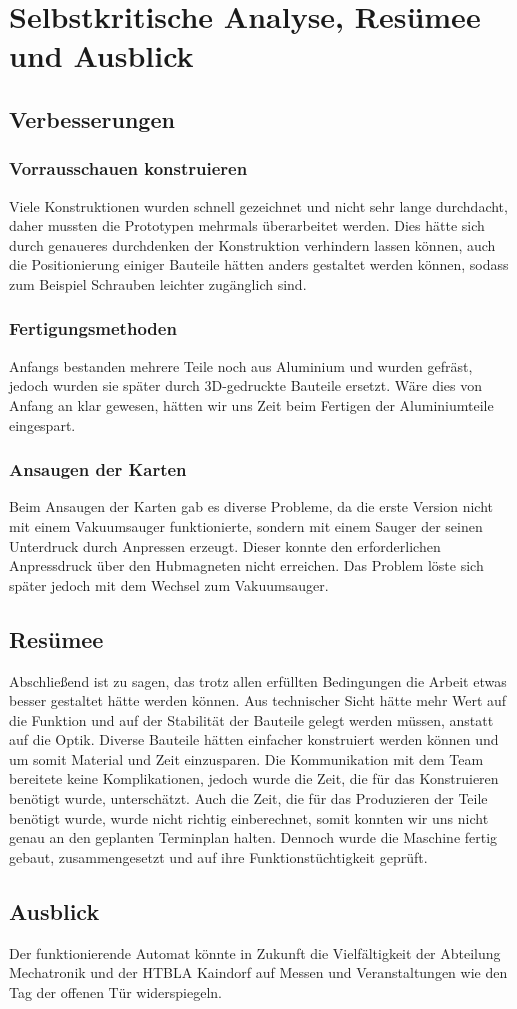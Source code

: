 \section{Selbstkritische Analyse, Resümee und Ausblick}
\subsection{Verbesserungen}

\subsubsection{Vorrausschauen konstruieren}
Viele Konstruktionen wurden schnell gezeichnet und nicht sehr lange durchdacht, daher mussten die Prototypen mehrmals überarbeitet werden.
Dies hätte sich durch genaueres durchdenken der Konstruktion verhindern lassen können, auch die Positionierung
einiger Bauteile hätten anders gestaltet werden können, sodass zum Beispiel Schrauben leichter zugänglich sind.

\subsubsection{Fertigungsmethoden}
Anfangs bestanden mehrere Teile noch aus Aluminium und wurden gefräst, jedoch wurden sie später durch 3D-gedruckte
Bauteile ersetzt. Wäre dies von Anfang an klar gewesen, hätten wir uns Zeit beim Fertigen der Aluminiumteile eingespart.
\subsubsection{Ansaugen der Karten}
Beim Ansaugen der Karten gab es diverse Probleme, da die erste Version nicht mit einem Vakuumsauger funktionierte, sondern
mit einem Sauger der seinen Unterdruck durch Anpressen erzeugt. Dieser konnte den erforderlichen Anpressdruck über
den Hubmagneten nicht erreichen. Das Problem löste sich später jedoch mit dem Wechsel zum Vakuumsauger.

\subsection{Resümee}
Abschließend ist zu sagen, das trotz allen erfüllten Bedingungen die Arbeit etwas besser gestaltet hätte werden können.
Aus technischer Sicht hätte mehr Wert auf die Funktion und auf der Stabilität der Bauteile gelegt werden müssen, anstatt
auf die Optik. Diverse Bauteile hätten einfacher konstruiert werden können und um somit Material und Zeit einzusparen.
Die Kommunikation mit dem Team bereitete keine Komplikationen, jedoch wurde die Zeit, die für das Konstruieren benötigt wurde, unterschätzt. Auch die Zeit, die für das Produzieren der Teile benötigt wurde, wurde nicht richtig einberechnet, somit
konnten wir uns nicht genau an den geplanten Terminplan halten. Dennoch wurde die Maschine fertig gebaut, zusammengesetzt
und auf ihre Funktionstüchtigkeit geprüft.

\subsection{Ausblick}
Der funktionierende Automat könnte in Zukunft die Vielfältigkeit der Abteilung Mechatronik und der HTBLA Kaindorf auf
Messen und Veranstaltungen wie den Tag der offenen Tür widerspiegeln.